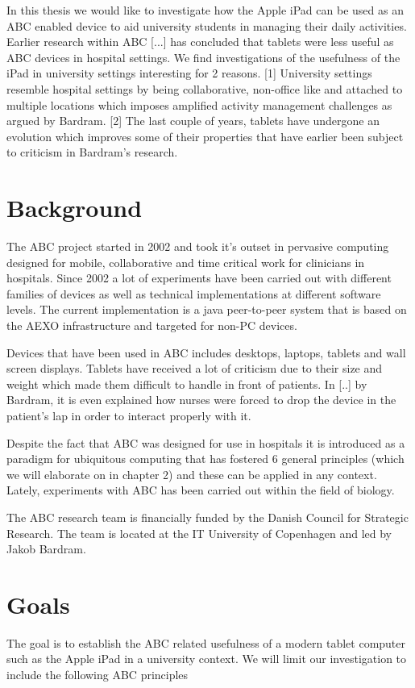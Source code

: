 In this thesis we would like to investigate how the Apple iPad can be used as an ABC enabled device to aid university students in managing their daily activities. Earlier research within ABC [...] has concluded that tablets were less useful as ABC devices in hospital settings. We find investigations of the usefulness of the iPad in university settings interesting for 2 reasons. [1] University settings resemble hospital settings by being collaborative, non-office like and attached to multiple locations which imposes amplified activity management challenges as argued by Bardram. [2] The last couple of years, tablets have undergone an evolution which improves some of their properties that have earlier been subject to criticism in Bardram's research.

\section{Background}
The ABC project started in 2002 and took it's outset in pervasive computing designed for mobile, collaborative and time critical work for clinicians in hospitals. Since 2002 a lot of experiments have been carried out with different families of devices as well as technical implementations at different software levels. The current implementation is a java peer-to-peer system that is based on the AEXO infrastructure and targeted for non-PC devices.

Devices that have been used in ABC includes desktops, laptops, tablets and wall screen displays. Tablets have received a lot of criticism due to their size and weight which made them difficult to handle in front of patients. In [..] by Bardram, it is even explained how nurses were forced to drop the device in the patient's lap in order to interact properly with it.

Despite the fact that ABC was designed for use in hospitals it is introduced as a paradigm for ubiquitous computing that has fostered 6 general principles (which we will elaborate on in chapter 2) and these can be applied in any context. Lately, experiments with ABC has been carried out within the field of biology.

The ABC research team is financially funded by the Danish Council for Strategic Research. The team is located at the IT University of Copenhagen and led by Jakob Bardram.

\section{Goals}
The goal is to establish the ABC related usefulness of a modern tablet computer such as the Apple iPad in a university context. We will limit our investigation to include the following ABC principles

